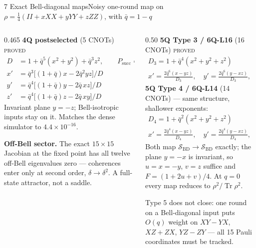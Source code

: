 \documentclass[aspectratio=169,10pt,t]{beamer}
\newcommand{\Tr}{\operatorname{Tr}}
\newcommand{\qb}{\bar{q}}
\newcommand{\acc}[1]{{\color{qitaccent}#1}}
\newcommand{\warn}[1]{{\color{qitwarn}#1}}
\newcommand{\stat}[1]{{\scriptsize\color{qitgray}\textsc{#1}}}
\begin{document}
\begin{frame}{7 \quad Exact Bell-diagonal maps}{Noisy one-round map on $\rho=\tfrac14(II+xXX+yYY+zZZ)$, with $\qb=1-q$}
  \scriptsize
  \vspace{1.0ex}
  \begin{columns}[T,onlytextwidth]
  \begin{column}{0.465\textwidth}\vspace{0pt}
    \textbf{4Q postselected} (5 CNOTs)\; \stat{proved}
    \begin{align*}
      D &= 1+\qb^{5}(x^{2}+y^{2})+\qb^{3}z^{2},\qquad
      P_{\mathrm{succ}}=\tfrac{D}{4}\\[0.2ex]
      x' &= \qb^{3}\bigl[(1+\qb)x-2\qb^{2}yz\bigr]/D\\
      y' &= \qb^{4}\bigl[(1+\qb)y-2\qb\,xz\bigr]/D\\
      z' &= \qb^{4}\bigl[(1+\qb)z-2\qb\,xy\bigr]/D
    \end{align*}
    Invariant plane $y=-z$; Bell-isotropic inputs stay on it. Matches the
    dense simulator to $4.4\times10^{-16}$.
    \smallskip

    \textbf{Off-Bell sector.}\; The exact $15\times15$ Jacobian at the fixed
    point has \acc{all twelve off-Bell eigenvalues zero} --- coherences enter
    only at second order, $\delta\to\delta^{2}$. A full-state attractor, not
    a saddle.
  \end{column}
  \begin{column}{0.50\textwidth}\vspace{0pt}
    \textbf{5Q Type 3 / 6Q-L16} (16 CNOTs)\; \stat{proved}
    \begin{gather*}
      D_{3}=1+\qb^{4}(x^{2}+y^{2}+z^{2})\\
      x'=\tfrac{2\qb^{6}(x-yz)}{D_{3}},\quad
      y'=\tfrac{2\qb^{6}(y-xz)}{D_{3}},\quad
      z'=\tfrac{\qb^{5}(1+\qb)(z-xy)}{D_{3}}
    \end{gather*}
    \textbf{5Q Type 4 / 6Q-L14} (14 CNOTs) --- same structure, shallower
    exponents:
    \begin{gather*}
      D_{4}=1+\qb^{2}(x^{2}+y^{2}+z^{2})\\
      x'=\tfrac{2\qb^{4}(x-yz)}{D_{4}},\quad
      y'=\tfrac{2\qb^{4}(y-xz)}{D_{4}},\quad
      z'=\tfrac{\qb^{3}(1+\qb)(z-xy)}{D_{4}}
    \end{gather*}
    \smallskip
    Both map $\mathcal{S}_{\mathrm{BD}}\to\mathcal{S}_{\mathrm{BD}}$
    \acc{exactly}; the plane $y=-x$ is invariant, so $u=x=-y$, $v=z$ suffice
    and $F=(1+2u+v)/4$. At $q=0$ every map reduces to $\rho^{2}/\Tr\rho^{2}$.
    \smallskip

    \warn{Type 5 does not close:} one round on a Bell-diagonal input puts
    $O(q)$ weight on $XY\!-\!YX$, $XZ\!+\!ZX$, $YZ\!-\!ZY$ --- all 15 Pauli
    coordinates must be tracked.
  \end{column}
  \end{columns}
\end{frame}
\end{document}
